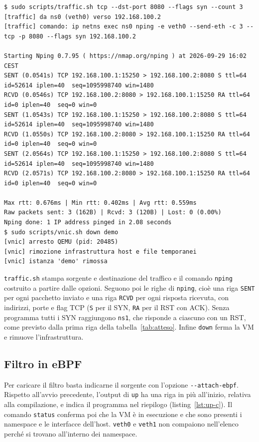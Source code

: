 \noindent\begin{minipage}{\linewidth}
\begin{lstlisting}[style=terminale, caption={Traffico verso la porta 8080 senza programma e arresto dell'istanza}, label={lst:traffic-senza}]
$ sudo scripts/traffic.sh tcp --dst-port 8080 --flags syn --count 3
[traffic] da ns0 (veth0) verso 192.168.100.2
[traffic] comando: ip netns exec ns0 nping -e veth0 --send-eth -c 3 --tcp -p 8080 --flags syn 192.168.100.2

Starting Nping 0.7.95 ( https://nmap.org/nping ) at 2026-09-29 16:02 CEST
SENT (0.0541s) TCP 192.168.100.1:15250 > 192.168.100.2:8080 S ttl=64 id=52614 iplen=40  seq=1095998740 win=1480
RCVD (0.0546s) TCP 192.168.100.2:8080 > 192.168.100.1:15250 RA ttl=64 id=0 iplen=40  seq=0 win=0
SENT (1.0543s) TCP 192.168.100.1:15250 > 192.168.100.2:8080 S ttl=64 id=52614 iplen=40  seq=1095998740 win=1480
RCVD (1.0550s) TCP 192.168.100.2:8080 > 192.168.100.1:15250 RA ttl=64 id=0 iplen=40  seq=0 win=0
SENT (2.0564s) TCP 192.168.100.1:15250 > 192.168.100.2:8080 S ttl=64 id=52614 iplen=40  seq=1095998740 win=1480
RCVD (2.0571s) TCP 192.168.100.2:8080 > 192.168.100.1:15250 RA ttl=64 id=0 iplen=40  seq=0 win=0

Max rtt: 0.676ms | Min rtt: 0.402ms | Avg rtt: 0.559ms
Raw packets sent: 3 (162B) | Rcvd: 3 (120B) | Lost: 0 (0.00%)
Nping done: 1 IP address pinged in 2.08 seconds
$ sudo scripts/vnic.sh down demo
[vnic] arresto QEMU (pid: 20485)
[vnic] rimozione infrastruttura host e file temporanei
[vnic] istanza 'demo' rimossa
\end{lstlisting}
\end{minipage}

\texttt{traffic.sh} stampa sorgente e destinazione del traffico e il comando \texttt{nping} costruito a partire dalle opzioni. Seguono poi le righe di \texttt{nping}, cioè una riga \texttt{SENT} per ogni pacchetto inviato e una riga \texttt{RCVD} per ogni risposta ricevuta, con indirizzi, porte e flag TCP (\texttt{S} per il SYN, \texttt{RA} per il RST con ACK). Senza programma tutti i SYN raggiungono \texttt{ns1}, che risponde a ciascuno con un RST, come previsto dalla prima riga della tabella~\ref{tab:atteso}. Infine \texttt{down} ferma la VM e rimuove l'infrastruttura.

\subsection{Filtro in eBPF}

Per caricare il filtro basta indicarne il sorgente con l'opzione \texttt{-{}-attach-ebpf}. Rispetto all'avvio precedente, l'output di \texttt{up} ha una riga in più all'inizio, relativa alla compilazione, e indica il programma nel riepilogo (listing~\ref{lst:up-c}). Il comando \texttt{status} conferma poi che la VM è in esecuzione e che sono presenti i namespace e le interfacce dell'host. \texttt{veth0} e \texttt{veth1} non compaiono nell'elenco perché si trovano all'interno dei namespace.

